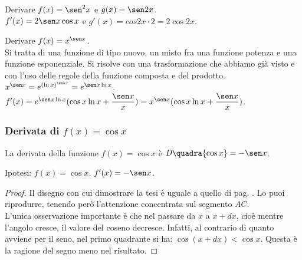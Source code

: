 \begin{esempio}
Derivare $f(x)=\sen^2 x$ e $g(x)= \sen 2x$.\\
$f'(x)=2\sen x \cos x$ e $g'(x)=cos 2x\cdot 2= 2 \cos 2x$.
\end{esempio}

\begin{esempio}
  Derivare $f(x)=x^{\sen x}$.\\
  Si tratta di una funzione di tipo nuovo, un misto fra una funzione potenza
  e una funzione esponenziale. Si risolve con una trasformazione che abbiamo
  già visto e con l'uso delle regole della funzione composta e del prodotto.\\
  $x^{\sen x}=e^{{(\ln x)}^{\sen x}}=e^{\sen x\ln x}$.\\
  $f'(x)=e^{\sen x\ln x}(\cos x \ln x +\dfrac{\sen x}{x})=
  x^{\sen x}(\cos x \ln x +\dfrac{\sen x}{x})$.
\end{esempio}

 \subsubsection{Derivata di $f(x)=\cos x$}
\begin{teorema}
  La derivata della funzione $f(x)=\cos x$ è $\mathit{D}\quadra{\cos x}=
  -\sen x$.
\end{teorema}
\noindent Ipotesi: $f(x)=\cos x$. \tab $f'(x)=-\sen x$.
\begin{proof}
  Il disegno con cui dimostrare la tesi è uguale a quello di pag.
  \pageref{fig_diff01dseno}. Lo puoi riprodurre, tenendo però l'attenzione
  concentrata sul segmento $AC$.\\
L'unica osservazione importante è che nel passare da $x$ a $ x+dx$, cioè 
mentre l'angolo cresce, il valore del coseno decresce. Infatti, al contrario di 
quanto avviene per il seno, nel primo quadrante si ha: $ \cos(x+dx)<\cos x$. 
Questa è la ragione del segno meno nel risultato.
\end{proof}

\begin{inaccessibleblock}
  \begin{minipage}[]{.47\textwidth}
    \begin{center} \coseno \end{center}
 \end{minipage} 
  \hfill
 \begin{minipage}[]{.47\textwidth}
 \begin{center} \tangenticoseno \end{center}
 \end{minipage}
\end{inaccessibleblock}
\label{}

